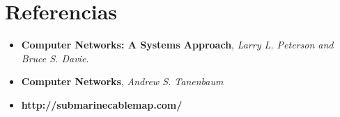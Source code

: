 \documentclass[a4paper,11pt]{article}
\begin{document}
\section{Referencias}
\begin{itemize}
	\item \textbf{Computer Networks: A Systems Approach}, \textit{Larry L. Peterson and Bruce S. Davie.}
	\item \textbf{Computer Networks}, \textit{Andrew S. Tanenbaum}
	\item \textbf{http://submarinecablemap.com/}
\end{itemize}
\end{document}
